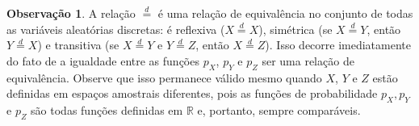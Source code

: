 \documentclass[12pt,portuguese]{article}
\theoremstyle{definition}
\newtheorem{remark}[remark]{Observação}
\begin{document}
\begin{remark}\label{rem:relacao-de-equivalencia}
A relação $\overset{d}{=}$ é uma relação de equivalência no conjunto de todas as
variáveis aleatórias discretas: é reflexiva ($X \overset{d}{=} X$), simétrica
(se $X \overset{d}{=} Y$, então $Y \overset{d}{=} X$) e transitiva
(se $X \overset{d}{=} Y$ e $Y \overset{d}{=} Z$, então $X \overset{d}{=} Z$). Isso
decorre imediatamente do fato de a igualdade entre as funções \(p_X\), \(p_Y\)
e \(p_Z\) ser uma relação de equivalência. Observe que isso permanece válido mesmo
quando \(X\), \(Y\) e \(Z\) estão definidas em espaços amostrais diferentes, pois as funções de probabilidade
$p_X, p_Y$ e $p_Z$ são todas funções definidas em $\mathbb{R}$ e, portanto, sempre
comparáveis.
\end{remark}





\end{document}
